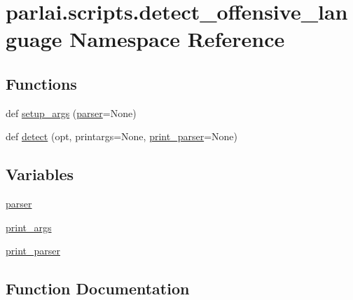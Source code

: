 \hypertarget{namespaceparlai_1_1scripts_1_1detect__offensive__language}{}\section{parlai.\+scripts.\+detect\+\_\+offensive\+\_\+language Namespace Reference}
\label{namespaceparlai_1_1scripts_1_1detect__offensive__language}
\subsection*{Functions}
\begin{DoxyCompactItemize}
\item 
def \hyperlink{namespaceparlai_1_1scripts_1_1detect__offensive__language_ab3f20447fd2442afdcd45dd77b619378}{setup\+\_\+args} (\hyperlink{namespaceparlai_1_1scripts_1_1detect__offensive__language_a1911e11825f0b58da4e082a1697d968c}{parser}=None)
\item 
def \hyperlink{namespaceparlai_1_1scripts_1_1detect__offensive__language_aecc66ec4441e506a93d25964889c185f}{detect} (opt, printargs=None, \hyperlink{namespaceparlai_1_1scripts_1_1detect__offensive__language_acb74ddd962fd2fc50270c37cdcd65c83}{print\+\_\+parser}=None)
\end{DoxyCompactItemize}
\subsection*{Variables}
\begin{DoxyCompactItemize}
\item 
\hyperlink{namespaceparlai_1_1scripts_1_1detect__offensive__language_a1911e11825f0b58da4e082a1697d968c}{parser}
\item 
\hyperlink{namespaceparlai_1_1scripts_1_1detect__offensive__language_a6d984125c3831773988d61d36c68dc60}{print\+\_\+args}
\item 
\hyperlink{namespaceparlai_1_1scripts_1_1detect__offensive__language_acb74ddd962fd2fc50270c37cdcd65c83}{print\+\_\+parser}
\end{DoxyCompactItemize}


\subsection{Function Documentation}
\mbox{\label{namespaceparlai_1_1scripts_1_1detect__offensive__language_aecc66ec4441e506a93d25964889c185f}} 
